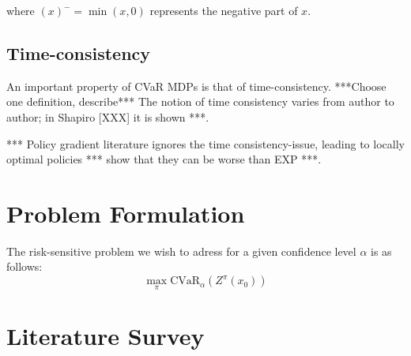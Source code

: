 where $(x)^- = \min(x, 0)$ represents the negative part of $x$.


\subsection{Time-consistency}
An important property of CVaR MDPs is that of time-consistency. ***Choose one definition, describe*** The notion of time consistency varies from author to author; in Shapiro [XXX] it is shown ***.

*** Policy gradient literature ignores the time consistency-issue, leading to locally optimal policies *** show that they can be worse than EXP ***.



\section{Problem Formulation}\label{sec:prelim:problem}


The risk-sensitive problem we wish to adress for a given confidence level $\alpha$ is as follows:
\begin{equation}
\max_\pi \text{CVaR}_\alpha(Z^\pi(x_0))
\end{equation}




\section{Literature Survey}\label{sec:prelim:literature}


